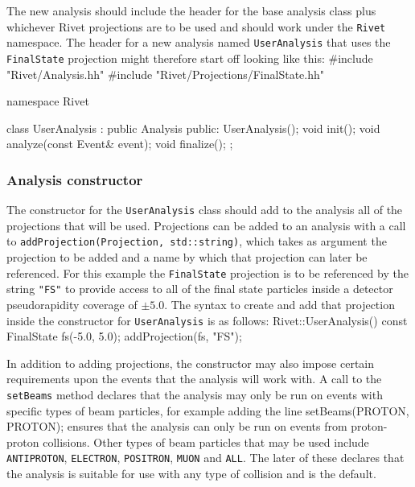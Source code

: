 \documentclass{JHEP3}
\newenvironment{snippet}{\Verbatim}{\endVerbatim}
\newcommand{\code}[1]{\texttt{#1}\xspace}
\begin{document}
The new analysis should include the header for the base analysis class plus
whichever Rivet projections are to be used and should work under the
\code{Rivet} namespace.  The header for a new analysis named \code{UserAnalysis}
that uses the \code{FinalState} projection might therefore start off looking
like this:
%
\begin{snippet}
#include "Rivet/Analysis.hh"
#include "Rivet/Projections/FinalState.hh"

namespace Rivet {

  class UserAnalysis : public Analysis {
  public:
    UserAnalysis();
    void init();
    void analyze(const Event& event);
    void finalize();
  };

}
\end{snippet}

\subsubsection{Analysis constructor}
The constructor for the \code{UserAnalysis} class should add to the analysis all
of the projections that will be used.  Projections can be added to an analysis
with a call to \code{addProjection(Projection, std::string)}, which takes as
argument the projection to be added and a name by which that projection can
later be referenced.  For this example the \code{FinalState} projection is to be
referenced by the string \code{"FS"} to provide access to all of the final state
particles inside a detector pseudorapidity coverage of $\pm 5.0$.  The syntax to
create and add that projection inside the constructor for \code{UserAnalysis} is
as follows:
%
\begin{snippet}
Rivet::UserAnalysis() {
  const FinalState fs(-5.0, 5.0);
  addProjection(fs, "FS");
}
\end{snippet}

In addition to adding projections, the constructor may also impose certain
requirements upon the events that the analysis will work with.  A call to the
\code{setBeams} method declares that the analysis may only be run on events with
specific types of beam particles, for example adding the line
%
\begin{snippet}
  setBeams(PROTON, PROTON);
\end{snippet}
%
\noindent ensures that the analysis can only be run on events from proton-proton
collisions.  Other types of beam particles that may be used include
\code{ANTIPROTON}, \code{ELECTRON}, \code{POSITRON}, \code{MUON} and \code{ALL}.
The later of these declares that the analysis is suitable for use with any type
of collision and is the default.
\end{document}
